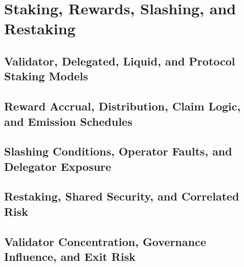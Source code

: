 \chapter{Staking, Rewards, Slashing, and Restaking}

\section{Validator, Delegated, Liquid, and Protocol Staking Models}

\section{Reward Accrual, Distribution, Claim Logic, and Emission Schedules}

\section{Slashing Conditions, Operator Faults, and Delegator Exposure}

\section{Restaking, Shared Security, and Correlated Risk}

\section{Validator Concentration, Governance Influence, and Exit Risk}
